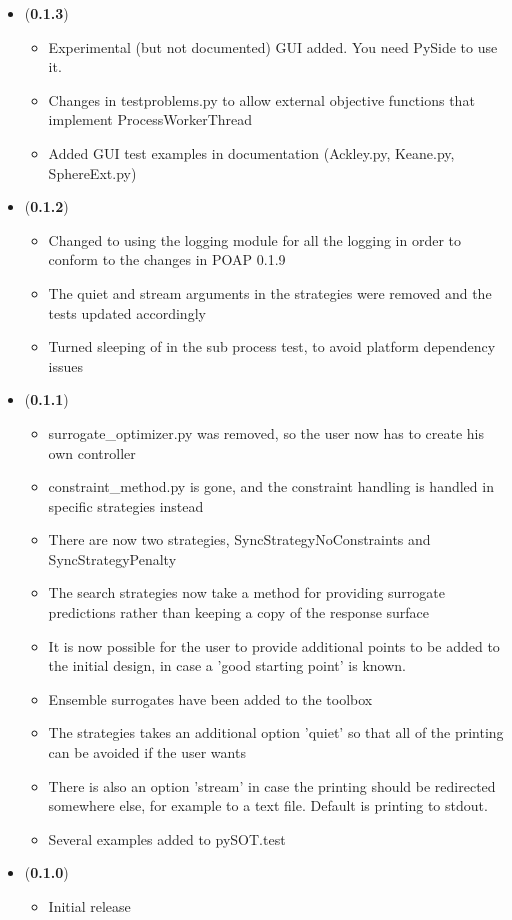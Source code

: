 \documentclass[]{article}
\begin{document}
\begin{itemize}
\item (\textbf{0.1.3}) 
\begin{itemize}
\item Experimental (but not documented) GUI added. You need PySide to use it.
\item Changes in testproblems.py to allow external objective functions that implement ProcessWorkerThread
\item Added GUI test examples in documentation (Ackley.py, Keane.py, SphereExt.py)
\end{itemize}

\item (\textbf{0.1.2})
\begin{itemize}
\item 	Changed to using the logging module for all the logging in order to conform to the changes in POAP 0.1.9
\item The quiet and stream arguments in the strategies were removed and the tests updated accordingly
\item Turned sleeping of in the sub process test, to avoid platform dependency issues
\end{itemize}

\item (\textbf{0.1.1})
\begin{itemize}
\item surrogate\_optimizer.py was removed, so the user now has to create his own controller
\item constraint\_method.py is gone, and the constraint handling is handled in specific strategies instead
\item 	There are now two strategies, SyncStrategyNoConstraints and SyncStrategyPenalty
\item The search strategies now take a method for providing surrogate predictions rather than keeping a copy of the response surface
\item It is now possible for the user to provide additional points to be added to the initial design, in case a 'good starting point' is known.
\item Ensemble surrogates have been added to the toolbox
\item 	The strategies takes an additional option 'quiet' so that all of the printing can be avoided if the user wants
\item There is also an option 'stream' in case the printing should be redirected somewhere else, for example to a text file. Default is printing to stdout.
\item 	Several examples added to pySOT.test
\end{itemize}
\item (\textbf{0.1.0})
\begin{itemize}
\item 	Initial release
\end{itemize}
\end{itemize}
\end{document}
